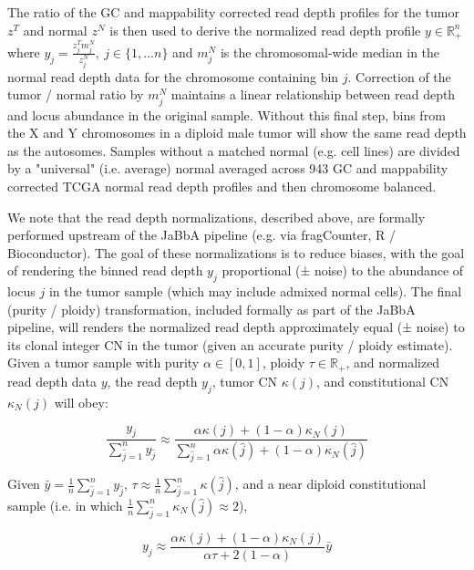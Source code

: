 \documentclass[phd,tocprelim]{cornell}
\begin{document}
The ratio of the GC and mappability corrected read depth profiles for the tumor $z^T$ and normal $z^N$ is then used to derive the normalized read depth profile $y \in \mathbb{R}^n_+$ where $y_j = \frac{z_j^Tm_j^N}{z_j^N},~j \in \{1, ... n\}$ and $m^N_j$ is the chromosomal-wide median in the normal read depth data for the chromosome containing bin $j$.  Correction of the tumor / normal ratio by $m^N_j$ maintains a linear relationship between read depth and locus abundance in the original sample. Without this final step, bins from the X and Y chromosomes in a diploid male tumor will show the same read depth as the autosomes.  Samples without a matched normal (e.g. cell lines) are divided by a "universal" (i.e. average) normal averaged across 943 GC and mappability corrected TCGA normal read depth profiles and then chromosome balanced. 


We note that the read depth normalizations, described above, are formally performed upstream of the JaBbA pipeline (e.g. via fragCounter, R / Bioconductor). The goal of these normalizations is to reduce biases, with the goal of rendering the binned read depth $y_j$ proportional (± noise) to the abundance of locus $j$ in the tumor sample (which may include admixed normal cells).  The final (purity / ploidy) transformation, included formally as part of the JaBbA pipeline, will renders the normalized read depth approximately equal (± noise) to its clonal integer CN in the tumor (given an accurate purity / ploidy estimate). Given a tumor sample with purity $\alpha \in [0, 1]$, ploidy $\tau \in \mathbb{R}_+$, and normalized read depth data $y$, the read depth $y_j$, tumor CN $\kappa(j)$, and constitutional CN $\kappa_N(j)$ will obey:

\begin{equation} \label{eq:ppbins}
\frac{y_j}{\sum_{\hat{j} = 1}^n y_{\hat{j}}} \approx \frac{\alpha \kappa(j) + (1-\alpha)\kappa_N(j)}{\sum_{\hat{j} = 1}^n \alpha \kappa(\hat{j}) + (1-\alpha)\kappa_N(\hat{j})}
\end{equation}

Given $\bar{y} = \frac{1}{n}\sum_{\hat{j} = 1}^{n} y_{\hat{j}}$, $\tau \approx \frac{1}{n}\sum_{\hat{j} = 1}^{n} \kappa(\hat{j})$, and a near diploid constitutional sample (i.e. in which $\frac{1}{n}\sum_{\hat{j} = 1}^{n} \kappa_N(\hat{j}) \approx 2$),

\begin{equation} \label{eq:ppbins2}
y_j \approx \frac{\alpha\kappa(j) + (1-\alpha)\kappa_N(j)}{\alpha \tau + 2(1-\alpha)} \bar{y} 
\end{equation}
\end{document}
